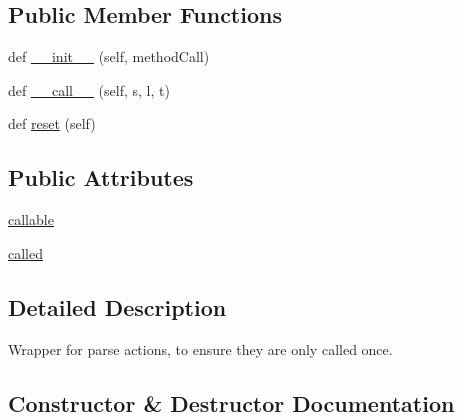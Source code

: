 \subsection*{Public Member Functions}
\begin{DoxyCompactItemize}
\item 
def \hyperlink{classpkg__resources_1_1__vendor_1_1pyparsing_1_1OnlyOnce_a0a2ae7702105ceddb01bc1d2a93336b8}{\+\_\+\+\_\+init\+\_\+\+\_\+} (self, method\+Call)
\item 
def \hyperlink{classpkg__resources_1_1__vendor_1_1pyparsing_1_1OnlyOnce_a1352afa79608d4022813b2d9aa6d1131}{\+\_\+\+\_\+call\+\_\+\+\_\+} (self, s, l, t)
\item 
def \hyperlink{classpkg__resources_1_1__vendor_1_1pyparsing_1_1OnlyOnce_a925ee2e194f1e319c743b8655bd8bf47}{reset} (self)
\end{DoxyCompactItemize}
\subsection*{Public Attributes}
\begin{DoxyCompactItemize}
\item 
\hyperlink{classpkg__resources_1_1__vendor_1_1pyparsing_1_1OnlyOnce_a3a381a4be1971de3ef2f12a762332d28}{callable}
\item 
\hyperlink{classpkg__resources_1_1__vendor_1_1pyparsing_1_1OnlyOnce_a0fbd7a1c2f5fb1c49e1a544f1389ee08}{called}
\end{DoxyCompactItemize}


\subsection{Detailed Description}
\begin{DoxyVerb}Wrapper for parse actions, to ensure they are only called once.
\end{DoxyVerb}
 

\subsection{Constructor \& Destructor Documentation}
\mbox{\label{classpkg__resources_1_1__vendor_1_1pyparsing_1_1OnlyOnce_a0a2ae7702105ceddb01bc1d2a93336b8}} 
